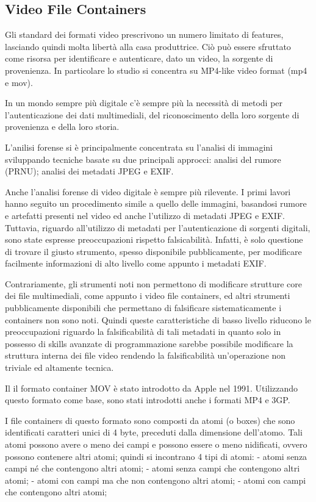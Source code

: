 \subsection{Video File Containers}

Gli standard dei formati video prescrivono un numero limitato di features, lasciando quindi molta libertà alla casa produttrice. Ciò può essere sfruttato come risorsa per identificare e autenticare, dato un video, la sorgente di provenienza. In particolare lo studio si concentra su MP4-like video format (mp4 e mov).

In un mondo sempre più digitale c'è sempre più la necessità di metodi per l'autenticazione dei dati multimediali, del riconoscimento della loro sorgente di provenienza e della loro storia.

L'anilisi forense si è principalmente concentrata su l'analisi di immagini sviluppando tecniche basate su due principali approcci: analisi del rumore (PRNU); analisi dei metadati JPEG e EXIF.

Anche l'analisi forense di video digitale è sempre più rilevente. I primi lavori hanno seguito un procedimento simile a quello delle immagini, basandosi rumore e artefatti presenti nel video ed anche l'utilizzo di metadati JPEG e EXIF.
Tuttavia, riguardo all'utilizzo di metadati per l'autenticazione di sorgenti digitali, sono state espresse preoccupazioni rispetto falsicabilità. Infatti, è solo questione di trovare il giusto strumento, spesso disponibile pubblicamente, per modificare facilmente informazioni di alto livello come appunto i metadati EXIF.

Contrariamente, gli strumenti noti non permettono di modificare strutture core dei file multimediali, come appunto i video file containers, ed altri strumenti pubblicamente disponibili che permettano di falsificare sistematicamente i containers non sono noti. Quindi queste caratteristiche di basso livello riducono le preoccupazioni riguardo la falsificabilità di tali metadati in quanto solo in possesso di skills avanzate di programmazione sarebbe possibile modificare la struttura interna dei file video rendendo la falsificabilità un'operazione non triviale ed altamente tecnica.

Il il formato container MOV è stato introdotto da Apple nel 1991. Utilizzando questo formato come base, sono stati introdotti anche i formati MP4 e 3GP.

I file containers di questo formato sono composti da atomi (o boxes) che sono identificati caratteri unici di 4 byte, preceduti dalla dimensione dell'atomo. Tali atomi possono avere o meno dei campi e possono essere o meno nidificati, ovvero possono contenere altri atomi; quindi si incontrano 4 tipi di atomi:
- atomi senza campi né che contengono altri atomi;
- atomi senza campi che contengono altri atomi;
- atomi con campi ma che non contengono altri atomi;
- atomi con campi che contengono altri atomi;

